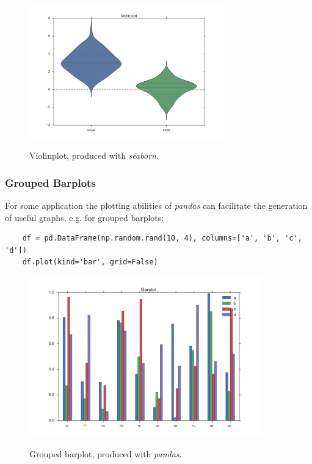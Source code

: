 \begin{figure}[H]
  \centering
  \includegraphics[width=0.75\textwidth]{../Images/violinplot.png}\\
  \caption{Violinplot, produced with \emph{seaborn}.}\label{fig:violin}
\end{figure}

\subsubsection{Grouped Barplots}

For some application the plotting abilities of \emph{pandas} can facilitate the generation of useful graphs, e.g. for grouped barplots:

\begin{lstlisting}
    df = pd.DataFrame(np.random.rand(10, 4), columns=['a', 'b', 'c', 'd'])
    df.plot(kind='bar', grid=False)
\end{lstlisting}

\begin{figure}[H]
  \centering
  \includegraphics[width=0.9\textwidth]{../Images/barplot.png}\\
  \caption{Grouped barplot, produced with \emph{pandas}.}\label{fig:barplot}
\end{figure}


